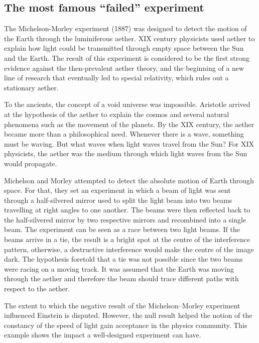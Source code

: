 \documentclass[
]{book}
\begin{document}
\hypertarget{michelson-morley}{%
\subsection{The most famous ``failed'' experiment}\label{michelson-morley}}

The Michelson-Morley experiment (1887) was designed to detect the motion of the Earth through the luminiferous aether. XIX century physicists used aether to explain how light could be transmitted through empty space between the Sun and the Earth. The result of this experiment is considered to be the first strong evidence against the then-prevalent aether theory, and the beginning of a new line of research that eventually led to special relativity, which rules out a stationary aether.

To the ancients, the concept of a void universe was impossible. Aristotle arrived at the hypothesis of the aether to explain the cosmos and several natural phenomena such as the movement of the planets. By the XIX century, the aether became more than a philosophical need. Whenever there is a wave, something must be waving. But what waves when light waves travel from the Sun? For XIX physicists, the aether was the medium through which light waves from the Sun would propagate.

Michelson and Morley attempted to detect the absolute motion of Earth through space. For that, they set an experiment in which a beam of light was sent through a half-silvered mirror used to split the light beam into two beams travelling at right angles to one another. The beams were then reflected back to the half-silvered mirror by two respective mirrors and recombined into a single beam. The experiment can be seen as a race between two light beams. If the beams arrive in a tie, the result is a bright spot at the centre of the interference pattern, otherwise, a destructive interference would make the centre of the image dark. The hypothesis foretold that a tie was not possible since the two beams were racing on a moving track. It was assumed that the Earth was moving through the aether and therefore the beam should trace different paths with respect to the aether.

The extent to which the negative result of the Michelson--Morley experiment influenced Einstein is disputed. However, the null result helped the notion of the constancy of the speed of light gain acceptance in the physics community. This example shows the impact a well-designed experiment can have.
\end{document}
